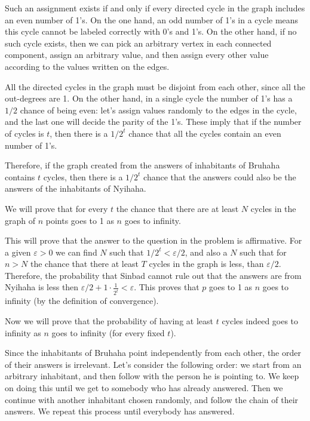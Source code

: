 \documentclass{article}
\begin{document}
Such an assignment exists if and only if every directed cycle in the graph includes an even number of 1's. On the one hand, an odd number of 1's in a cycle means this cycle cannot be labeled correctly with 0's and 1's. On the other hand, if no such cycle exists, then we can pick an arbitrary vertex in each connected component, assign an arbitrary value, and then assign every other value according to the values written on the edges.

All the directed cycles in the graph must be disjoint from each other, since all the out-degrees are 1. On the other hand, in a single cycle the number of 1's has a \(\displaystyle 1/2\) chance of being even: let's assign values randomly to the edges in the cycle, and the last one will decide the parity of the 1's. These imply that if the number of cycles is \(\displaystyle t\), then there is a \(\displaystyle 1/2^t\) chance that all the cycles contain an even number of 1's.

Therefore, if the graph created from the answers of inhabitants of Bruhaha contains \(\displaystyle t\) cycles, then there is a \(\displaystyle 1/2^t\) chance that the answers could also be the answers of the inhabitants of Nyihaha.

We will prove that for every \(\displaystyle t\) the chance that there are at least \(\displaystyle N\) cycles in the graph of \(\displaystyle n\) points goes to 1 as \(\displaystyle n\) goes to infinity.

This will prove that the answer to the question in the problem is affirmative. For a given \(\displaystyle \varepsilon>0\) we can find \(\displaystyle N\) such that \(\displaystyle 1/2^t<\varepsilon/2\), and also a \(\displaystyle N\) such that for \(\displaystyle n>N\) the chance that there at least \(\displaystyle T\) cycles in the graph is less, than \(\displaystyle \varepsilon/2\). Therefore, the probability that Sinbad cannot rule out that the answers are from Nyihaha is less then \(\displaystyle \varepsilon/2+1\cdot\frac{1}{2^t}<\varepsilon\). This proves that \(\displaystyle p\) goes to 1 as \(\displaystyle n\) goes to infinity (by the definition of convergence).

Now we will prove that the probability of having at least \(\displaystyle t\) cycles indeed goes to infinity as \(\displaystyle n\) goes to infinity (for every fixed \(\displaystyle t\)).

Since the inhabitants of Bruhaha point independently from each other, the order of their answers is irrelevant. Let's consider the following order: we start from an arbitrary inhabitant, and then follow with the person he is pointing to. We keep on doing this until we get to somebody who has already answered. Then we continue with another inhabitant chosen randomly, and follow the chain of their answers. We repeat this process until everybody has answered.
\end{document}
